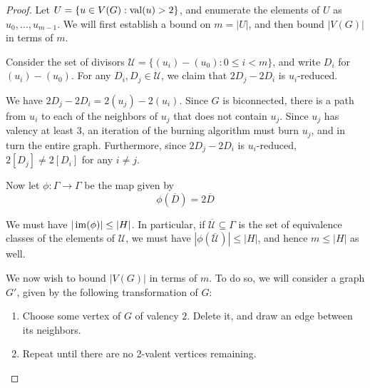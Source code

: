 \documentclass{amsart}
\begin{document}
\begin{proof}
  Let $U = \{u \in V(G) : \operatorname{val}(u) > 2\}$, and enumerate the elements
  of $U$ as $u_0, \ldots, u_{m-1}$. We will first establish a bound on
  $m = |U|$, and then bound $|V(G)|$ in terms of $m$.
  
  Consider the set of divisors $\mathcal{U} = \{(u_i) - (u_0) : 0 \le
  i < m\}$, and write $D_i$ for $(u_i) - (u_0)$. For any $D_i, D_j \in
  \mathcal{U}$, we claim that $2D_j - 2D_i$ is $u_i$-reduced.

  We have $2D_j - 2D_i = 2(u_j) - 2(u_i)$. Since $G$ is biconnected,
  there is a path from $u_i$ to each of the neighbors of $u_j$ that
  does not contain $u_j$. Since $u_j$ has valency at least $3$, an
  iteration of the burning algorithm must burn $u_j$, and in turn the
  entire graph. Furthermore, since $2D_j - 2D_i$ is $u_i$-reduced,
  $2[D_j] \ne 2[D_i]$ for any $i \ne j$.

  Now let $\phi:\Gamma \to \Gamma$ be the map given by
  \[
  \phi(\overline{D}) = 2\overline{D}
  \] 

  We must have $|\operatorname{im}(\phi)| \le |H|$. In particular, if
  $\overline{\mathcal{U}} \subseteq \Gamma$ is the set of equivalence
  classes of the elements of $\mathcal{U}$, we must have
  $|\phi(\overline{\mathcal{U}})| \le |H|$, and hence $m \le |H|$ as
  well.

  We now wish to bound $|V(G)|$ in terms of $m$. To do so, we will
  consider a graph $G'$, given by the following transformation of $G$:

  \begin{enumerate}
    \item Choose some vertex of $G$ of valency $2$. Delete it, and
      draw an edge between its neighbors.
    \item Repeat until there are no 2-valent vertices remaining.
  \end{enumerate}

\begin{center}
\end{center}
\end{proof}
\end{document}
